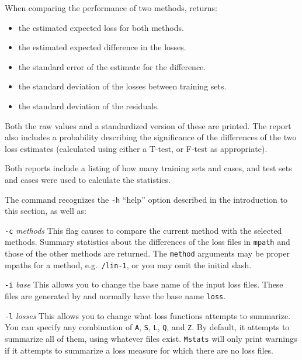 When comparing the performance of two methods, \mstats{} returns:\vspace{-5pt}
\begin{itemize}
\item the estimated expected loss for both methods.
\item the estimated expected difference in the losses.
\item the standard error of the estimate for the difference.
\item the standard deviation of the losses between training sets.
\item the standard deviation of the residuals.
\end{itemize}\vspace{-5pt}
Both the raw values and a standardized version of these are printed.
The report also includes a probability describing the significance of
the differences of the two loss estimates (calculated using either a
T-test, or F-test as appropriate).

Both reports include a listing of how many training sets and cases,
and test sets and cases were used to calculate the statistics.

The \mstats{} command recognizes the \texttt{-h} ``help'' option described in
the introduction to this section, as well as:\vspace{-4pt}
\begin{list}{}{\setlength{\leftmargin}{0.6in}\setlength{\labelsep}{0.2in}}
\item[\texttt{-c} {\rm\em methods}] 
    This flag causes \mstats{} to compare the current method with the
    selected methods. Summary statistics about the differences of the
    loss files in \texttt{mpath} and those of the other methods are
    returned.  The \texttt{method} arguments may be proper mpaths for
    a method, e.g.~\texttt{/lin-1}, or you may omit the initial slash.
\item[\texttt{-i} {\rm\em base}] 
    This allows you to change the base name of the input loss files.
    These files are generated by \mloss{} and normally have the base
    name \texttt{loss}.
\item[\texttt{-l} {\rm\em losses}] 
    This allows you to change what loss functions \mstats{} attempts
    to summarize. You can specify any combination of \texttt{A},
    \texttt{S}, \texttt{L}, \texttt{Q}, and \texttt{Z}. By default, it
    attempts to summarize all of them, using whatever files exist.
    \texttt{Mstats} will only print warnings if it attempts to
    summarize a loss measure for which there are no loss files.
\end{list}\vspace{-4pt}

